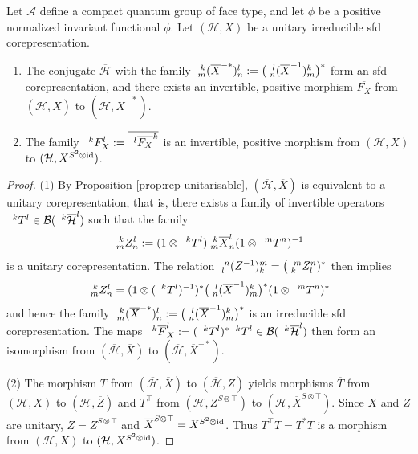 \begin{Prop} \label{prop:rep-f}
  Let $\mathscr{A}$ define a compact quantum group of face type, and let $\phi$ be a positive normalized
  invariant functional $\phi$. Let $(\mathcal{H},X)$ be a unitary
  irreducible sfd corepresentation. 
  \begin{enumerate}
  \item The conjugate $\overline{\mathcal{H}}$ with the family
    $\Gr{(\overline{X}^{-*})}{k}{l}{m}{n}:=\big(\Gr{(\overline{X}^{-1})}{l}{k}{n}{m}\big)^{*}$
    form an sfd corepresentation, and there
    exists an invertible, positive morphism $\overline{F_{X}}$ from
    $(\overline{\mathcal{H}},\overline{X})$ to
    $(\overline{\mathcal{H}},\overline{X}^{-*})$. %
  \item The family
    $\Gru{F_{X}}{k}{l}:=\overline{\Gru{\overline{F_{X}}}{l}{k}}$ is an
    invertible, positive morphism from $(\mathcal{H},X)$ to
    $(\mathcal{H},X^{S^{2} \otimes \id})$.
  \end{enumerate}
\end{Prop}
\begin{proof}
(1) By Proposition \ref{prop:rep-unitarisable},
$(\overline{\mathcal{H}},\overline{X})$ is equivalent to a unitary
corepresentation, that is, there exists a family of invertible operators
$\Gru{T}{k}{l} \in \mathcal{B}(\Gru{\overline{\mathcal{H}}}{k}{l})$
such that the family 
\begin{align*}
\Gr{Z}{k}{l}{m}{n}:= (1 \otimes
\Gru{T}{k}{l})\Gr{\overline{X}}{k}{l}{m}{n}(1 \otimes
\Gru{T}{m}{n})^{-1} 
\end{align*}
 is a unitary corepresentation. The relation
 $\Gr{(Z^{-1})}{n}{m}{l}{k}=\big(\Gr{Z}{m}{n}{k}{l})^{*}$ then implies
 \begin{align*}
   \Gr{Z}{k}{l}{m}{n} = (1 \otimes
   (\Gru{T}{k}{l})^{-1})^{*}\big(\Gr{(\overline{X}^{-1})}{l}{k}{n}{m}\big)^{*}(1
   \otimes \Gru{T}{m}{n})^{*}
 \end{align*}
 and hence the family 
 $\Gr{(\overline{X}^{-*})}{k}{l}{m}{n}:=\big(\Gr{(\overline{X}^{-1})}{l}{k}{n}{m}\big)^{*}$
 is an irreducible sfd corepresentation. The maps
 $\Gru{\overline{F}_{X}}{k}{l}:=(\Gru{T}{k}{l})^{*}\Gru{T}{k}{l} \in
  \mathcal{B}(\Gru{\overline{\mathcal{H}}}{k}{l})$
then form an isomorphism from $(\overline{\mathcal{H}},\overline{X})$ to
$(\overline{\mathcal{H}},\overline{X}^{-*})$.   

(2) The morphism $T$  from $(\overline{\mathcal{H}},\overline{X})$  to
$(\overline{\mathcal{H}},Z)$ yields morphisms $\overline{T}$ from
$(\mathcal{H},X)$ to $(\mathcal{H},\overline{Z})$ and $T^{\top}$ from $(\mathcal{H},Z^{S\otimes\top})$ to
$(\mathcal{H},\overline{X}^{S \otimes \top})$. Since $X$ and $Z$ are
unitary, $\overline{Z}=Z^{S\otimes \top}$ and  $\overline{X}^{S \otimes
  \top} = X^{S^{2} \otimes \id}$. Thus $T^{\top}\overline{T} =
\overline{T^{*}T}$ is a morphism from $(\mathcal{H},X)$ to
$(\mathcal{H},X^{S^{2}\otimes \id})$.
\end{proof}


